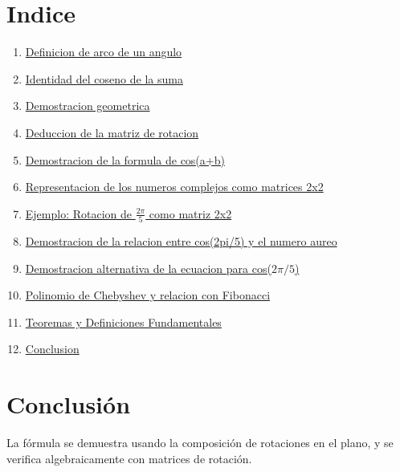 \documentclass{article}
\theoremstyle{definition}
\theoremstyle{plain}
\theoremstyle{remark}
\begin{document}
\section*{Indice}
\begin{enumerate}
  \item \hyperref[sec:arco]{Definicion de arco de un angulo}
  \item \hyperref[sec:identidad]{Identidad del coseno de la suma}
  \item \hyperref[sec:geom]{Demostracion geometrica}
  \item \hyperref[sec:rotacion]{Deduccion de la matriz de rotacion}
  \item \hyperref[sec:demcos]{Demostracion de la formula de cos(a+b)}
  \item \hyperref[sec:complejos]{Representacion de los numeros complejos como matrices 2x2}
  \item \hyperref[sec:ejemplo]{Ejemplo: Rotacion de $\frac{2\pi}{5}$ como matriz 2x2}
  \item \hyperref[sec:cosenoaureo]{Demostracion de la relacion entre cos(2pi/5) y el numero aureo}
  \item \hyperref[sec:demostracion_alternativa]{Demostracion alternativa de la ecuacion para cos($2\pi/5$)}
  \item \hyperref[sec:chebfib]{Polinomio de Chebyshev y relacion con Fibonacci}
  \item \hyperref[sec:teoremas]{Teoremas y Definiciones Fundamentales}
  \item \hyperref[sec:conclusion]{Conclusion}
\end{enumerate}



\newpage


\newpage


\newpage


\newpage


\newpage


\newpage


\newpage


\newpage


\newpage


\newpage


\newpage

\section{Conclusión}\label{sec:conclusion}
La fórmula se demuestra usando la composición de rotaciones en el plano, y se verifica algebraicamente con matrices de rotación.
\end{document}
